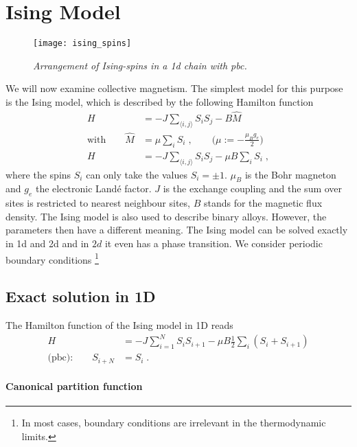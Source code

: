 \chapter{Ising Model}\label{chap:ising}
%


\begin{figure}[h]
\begin{center}
\texttt{[image: ising\_spins]}
\caption{{\it Arrangement of Ising-spins in a 1d chain with pbc.}}
\end{center}
\end{figure}
%



We will now examine collective magnetism.
The simplest model for this purpose is the Ising model, which is described by the following
Hamilton function 
%
\begin{align}
H &= - J \sum_{\langle i,j\rangle} S_{i} S_{j} - B \hat M\\
\text{with} \qquad \hat M &=  \mu \sum_{i} S_{i}\;,\qquad \bigg(\mu := - \frac{\mu_{B} g_{e}}{2}\bigg)\\
H&= - J \sum_{\langle i,j\rangle} S_{i} S_{j} - \mu B \sum_{i} S_{i}\;,
\end{align}
%
where the spins $S_{i}$ can only take the values  $S_{i}=\pm 1$.
$\mu_{B}$ is the Bohr magneton and $g_{e}$ the electronic Land\'e factor.
$J$ is the exchange coupling and the sum over sites is restricted to nearest neighbour sites, 
$B$ stands for the magnetic flux density.
The Ising model is also used to describe binary alloys.
However, the parameters then have a different meaning.
The Ising model can be solved exactly in 1d and 2d and in $2d$ it even has a phase transition. 
We consider periodic boundary conditions \footnote{In most cases, boundary conditions are 
irrelevant in the  thermodynamic limits. } 

\section{Exact solution in 1D}
The Hamilton function of the Ising model in 1D reads
%
\begin{align*}
H &= - J \sum_{i=1}^{N} S_{i} S_{i+1} - \mu  B \frac{1}{2} \sum_{i} (S_{i}+S_{i+1})\\
\text{(pbc):}\qquad S_{i+N} &= S_{i}\;.
\end{align*}
%

\subsubsection{Canonical partition function}

